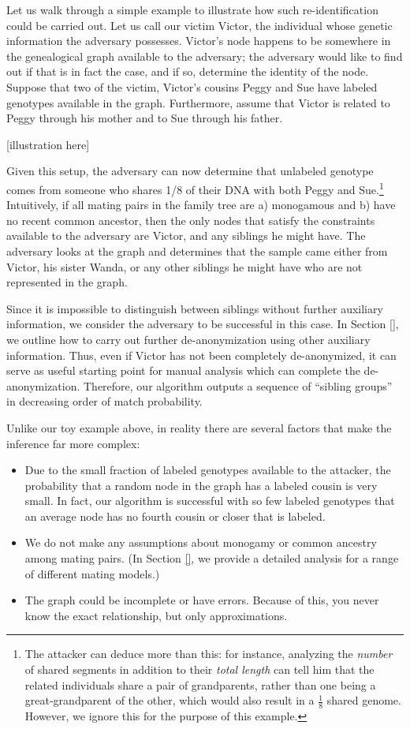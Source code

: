 \documentclass{article}
\begin{document}
Let us walk through a simple example to illustrate how such re-identification could be carried out. Let us call our victim Victor, the individual whose genetic information the adversary possesses.  Victor's node happens to be somewhere in the genealogical graph available to the adversary; the adversary would like to find out if that is in fact the case, and if so, determine the identity of the node. Suppose that two of the victim, Victor's cousins Peggy and Sue have labeled genotypes available in the graph. Furthermore, assume that Victor is related to Peggy through his mother and to Sue through his father.  

[illustration here]

Given this setup, the adversary can now determine that unlabeled genotype comes from someone who shares 1/8 of their DNA with both Peggy and Sue.\footnote{The attacker can deduce more than this: for instance, analyzing the {\em number} of shared segments in addition to their {\em total length} can tell him that the related individuals share a pair of grandparents, rather than one being a great-grandparent of the other, which would also result in a $\frac{1}{8}$ shared genome. However, we ignore this for the purpose of this  example.} Intuitively, if all mating pairs in the family tree are a) monogamous and b) have no recent common ancestor, then the only nodes that satisfy the constraints available to the adversary are Victor, and any siblings he might have. The adversary looks at the graph and determines that the sample came either from Victor, his sister Wanda, or any other siblings he might have who are not represented in the graph.

Since it is impossible to distinguish between siblings without further auxiliary information, we consider the adversary to be successful in this case. In Section \ref{}, we outline how to carry out further de-anonymization using other auxiliary information. Thus, even if Victor has not been completely de-anonymized, it can serve as useful starting point for manual analysis which can complete the de-anonymization. Therefore, our algorithm outputs a sequence of ``sibling groups'' in decreasing order of match probability.

Unlike our toy example above, in reality there are several factors that make the inference far more complex: 

\begin{itemize}
\item
Due to the small fraction of labeled genotypes available to the attacker, the probability that a random node in the graph has a labeled cousin is very small. In fact, our algorithm is successful with so few labeled genotypes that an average node has no fourth cousin or closer that is labeled.
\item
We do not make any assumptions about monogamy or common ancestry among mating pairs. (In Section \ref{}, we provide a detailed analysis for a range of different mating models.)
\item
The graph could be incomplete or have errors. Because of this, you never know the exact relationship, but only approximations.
\end{itemize}
\end{document}
